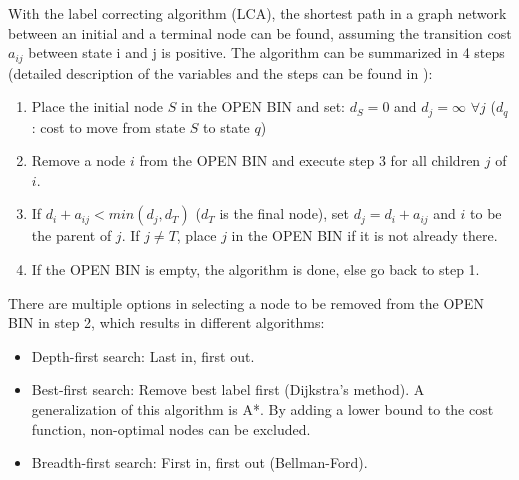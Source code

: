 With the label correcting algorithm (LCA), the shortest path in a graph network between an initial and a terminal node can be found, assuming the transition cost $a_{ij}$ between state i and j is positive. The algorithm can be summarized in 4 steps (detailed description of the variables and the steps can be found in \cite{Bertsekas1995}): 

\begin{enumerate}
	\item Place the initial node $S$ in the OPEN BIN and set: $d_S=0$ and $d_j=\infty$ $\forall j$ ($d_q$: cost to move from state $S$ to state $q$)
	\item Remove a node $i$ from the OPEN BIN and execute step 3 for all children $j$ of $i$.
	\item If $d_i + a_{ij} < min(d_j, d_T)$ ($d_ {T}$ is the final node), set $d_j = d_i + a_{ij}$ and $i$ to be the parent of $j$. If $j \neq T$, place $j$ in the OPEN BIN if it is not already there. 
	\item If the OPEN BIN is empty, the algorithm is done, else go back to step 1. 
\end{enumerate}

There are multiple options in selecting a node to be removed from the OPEN BIN in step 2, which results in different algorithms:

\begin{itemize}
	\item Depth-first search: Last in, first out. 
	\item Best-first search: Remove best label first (Dijkstra's method). A generalization of this algorithm is A*. By adding a lower bound to the cost function, non-optimal nodes can be excluded.
	\item Breadth-first search: First in, first out (Bellman-Ford). 
\end{itemize}